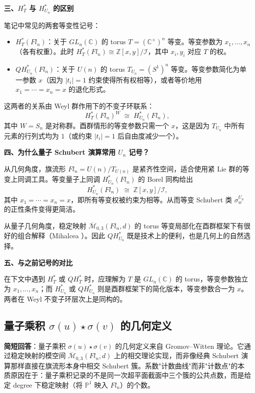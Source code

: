 \textbf{三、$H_T^*$ 与 $H_{U_n}^*$ 的区别}

笔记中常见的两套等变性记号：
\begin{itemize}
\item $H_T^*(Fl_n)$：关于 $GL_n(\mathbb{C})$ 的 torus $T = (\mathbb{C}^\times)^n$ 等变。等变参数为 $x_1, \ldots, x_n$（各有权重）。此时 $H_T^*(Fl_n) \cong \mathbb{Z}[x,y]/\mathcal{I}$，其中 $x_i, y_i$ 对应 $T$ 的权。
\item $QH_{U_n}^*(Fl_n)$：关于 $U(n)$ 的 torus $T_{U_n} = (S^1)^n$ 等变。等变参数简化为单一参数 $x$（因为 $|t_i|=1$ 约束使得所有权相等），或者等价地用 $x_1=\cdots=x_n=x$ 的退化形式。
\end{itemize}
这两者的关系由 Weyl 群作用下的不变子环联系：
$$H_T^*(Fl_n)^W \;\cong\; H_{U_n}^*(Fl_n),$$
其中 $W = S_n$ 是对称群。酉群情形的等变参数只需一个 $x$，这是因为 $T_{U_n}$ 中所有元素的行列式均为 $1$（或约束 $|t_i|=1$ 后自由度减少一个）。

\textbf{四、为什么量子 Schubert 演算常用 $U_n$ 记号？}

从几何角度，旗流形 $Fl_n = U(n)/T_{U(n)}$ 是紧齐性空间，适合使用紧 Lie 群的等变上同调工具。等变量子上同调 $H_{U_n}^*(Fl_n)$ 的 Borel 同构给出
$$H_{U_n}^*(Fl_n) \;\cong\; \mathbb{Z}[x,y]/\mathcal{I},$$
其中 $x_1=\cdots=x_n=x$，即所有等变权被约束为相等。从而等变 Schubert 类 $\sigma_w^{U_n}$ 的正性条件变得更简洁。

从量子几何角度，稳定映射 $\overline{\mathcal{M}}_{0,3}(Fl_n, d)$ 的 torus 等变局部化在酉群框架下有很好的组合解释（Mihalcea \cite{Mihalcea2004}）。因此 $QH_{U_n}^*$ 既是技术上的便利，也是几何上的自然选择。

\textbf{五、与之前记号的对比}

在下文中遇到 $H_T^*$ 或 $QH_T^*$ 时，应理解为 $T$ 是 $GL_n(\mathbb{C})$ 的 torus，等变参数独立为 $x_1, \ldots, x_n$；而 $H_{U_n}^*$ 或 $QH_{U_n}^*$ 则是酉群框架下的简化版本，等变参数合一为 $x$。两者在 Weyl 不变子环层次上是同构的。

\subsection{量子乘积 $\sigma(u) \star \sigma(v)$ 的几何定义}\label{sec:qa-QuantumStarProductGeometry}

\textbf{简短回答}：量子乘积 $\sigma(u) \star \sigma(v)$ 的几何定义来自 Gromov--Witten 理论。它通过稳定映射的模空间 $\overline{\mathcal{M}}_{0,3}(Fl_n, d)$ 上的相交理论实现，而非像经典 Schubert 演算那样直接在旗流形本身中相交 Schubert 簇。系数"计数曲线"而非"计数点"的本质原因在于：量子乘积记录的不是同一次超平面截面中三个簇的公共点数，而是给定 degree 下稳定映射（将 $\mathbb{P}^1$ 映入 $Fl_n$）的个数。

